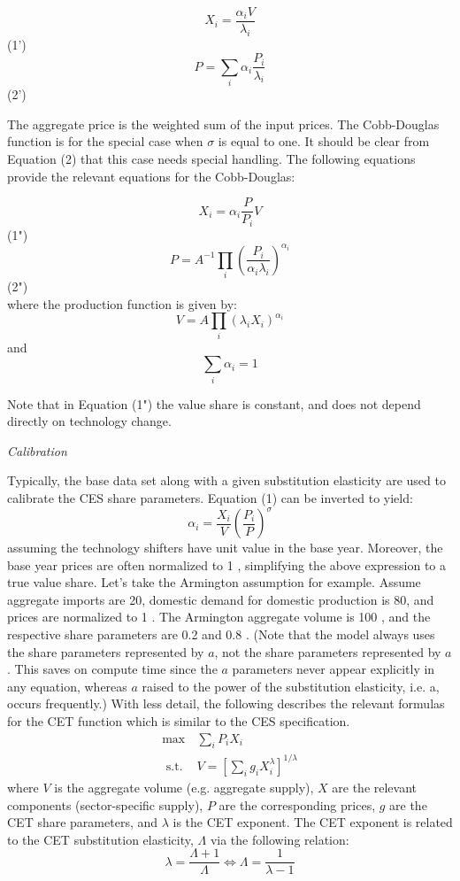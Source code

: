 \documentclass[12pt]{article}
\begin{document}
$$X_{i}=\frac{\alpha_{i} V}{\lambda_{i}}$$
(1')
$$P=\sum_{i} \alpha_{i} \frac{P_{i}}{\lambda_{i}}$$
(2')

The aggregate price is the weighted sum of the input prices. The Cobb-Douglas function is for the special case when $\sigma$ is equal to one. It should be clear from Equation (2) that this case needs special handling. The following equations provide the relevant equations for the Cobb-Douglas:

$$
X_{i}=\alpha_{i} \frac{P}{P_{i}} V
$$
(1")
$$
P=A^{-1} \prod_{i}\left(\frac{P_{i}}{\alpha_{i} \lambda_{i}}\right)^{\alpha_{i}}
$$
(2")\\
where the production function is given by:
$$
V=A \prod_{i}\left(\lambda_{i} X_{i}\right)^{\alpha_{i}}
$$
and
$$
\sum_{i} \alpha_{i}=1
$$

Note that in Equation (1") the value share is constant, and does not depend directly on technology change.

\textit{Calibration}

Typically, the base data set along with a given substitution elasticity are used to calibrate the CES share parameters. Equation (1) can be inverted to yield:
$$
\alpha_{i}=\frac{X_{i}}{V}\left(\frac{P_{i}}{P}\right)^{\sigma}
$$
assuming the technology shifters have unit value in the base year. Moreover, the base year prices are often normalized to 1 , simplifying the above expression to a true value share. Let's take the Armington assumption for example. Assume aggregate imports are 20, domestic demand for domestic production is 80, and prices are normalized to 1 . The Armington aggregate volume is 100 , and the respective share parameters are 0.2 and 0.8 . (Note that the model always uses the share parameters represented by $a$, not the share parameters represented by $a$. This saves on compute time since the $a$ parameters never appear explicitly in any equation, whereas $a$ raised to the power of the substitution elasticity, i.e. a, occurs frequently.)
With less detail, the following describes the relevant formulas for the CET function which is similar to the CES specification.
$$
\begin{array}{cc}
\max & \sum_{i} P_{i} X_{i} \\
\text { s.t. } & V=\left[\sum_{i} g_{i} X_{i}^{\lambda}\right]^{1 / \lambda}
\end{array}
$$
where $V$ is the aggregate volume (e.g. aggregate supply), $X$ are the relevant components (sector-specific supply), $P$ are the corresponding prices, $g$ are the CET share parameters, and $\lambda$ is the CET exponent. The CET exponent is related to the CET substitution elasticity, $\Lambda$ via the following relation:
$$
\lambda=\frac{\Lambda+1}{\Lambda} \Leftrightarrow \Lambda=\frac{1}{\lambda-1}
$$
\end{document}
